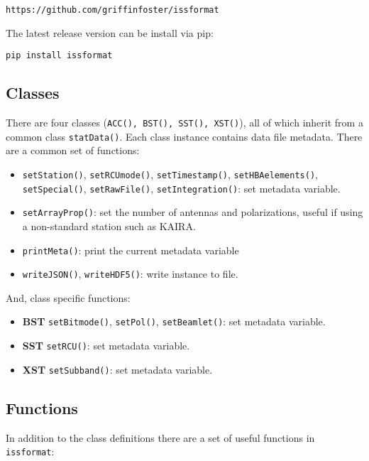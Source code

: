 \documentclass[10pt,a4paper]{article}
\begin{document}
\begin{verbatim}
https://github.com/griffinfoster/issformat
\end{verbatim}

\noindent The latest release version can be install via pip:

\begin{verbatim}
pip install issformat
\end{verbatim}

\subsection{Classes}

There are four classes (\texttt{ACC(), BST(), SST(), XST()}), all of which
inherit from a common class \texttt{statData()}. Each class instance contains
data file metadata. There are a common set of functions:

\begin{itemize}
    \item \texttt{setStation()}, \texttt{setRCUmode()}, \texttt{setTimestamp()},
    \texttt{setHBAelements()}, \texttt{setSpecial()}, \texttt{setRawFile()},
    \texttt{setIntegration()}: set metadata variable.
    \item \texttt{setArrayProp()}: set the number of antennas and polarizations,
    useful if using a non-standard station such as KAIRA.
    \item \texttt{printMeta()}: print the current metadata variable
    \item \texttt{writeJSON()}, \texttt{writeHDF5()}: write instance to file.
\end{itemize}

\noindent And, class specific functions:

\begin{itemize}
    \item \textbf{BST} \texttt{setBitmode()}, \texttt{setPol()},
    \texttt{setBeamlet()}: set metadata variable.
    \item \textbf{SST} \texttt{setRCU()}: set metadata variable.
    \item \textbf{XST} \texttt{setSubband()}: set metadata variable.
\end{itemize}

\subsection{Functions}

In addition to the class definitions there are a set of useful functions in
\texttt{issformat}:
\end{document}
